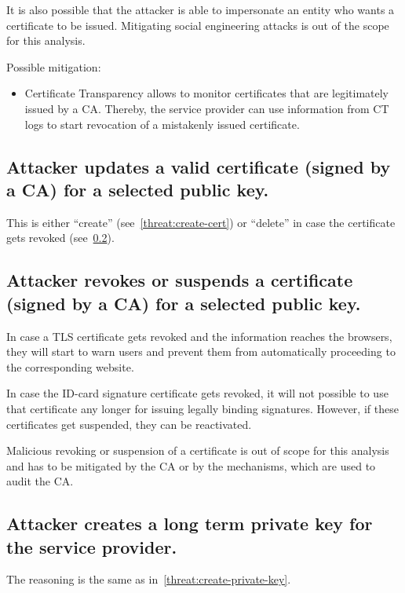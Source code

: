 It is also possible that the attacker is able to impersonate an entity who wants a certificate to be issued. Mitigating social engineering attacks is out of the scope for this analysis. 

Possible mitigation:
\begin{itemize}
 \item Certificate Transparency allows to monitor certificates that are legitimately issued by a CA. Thereby, the service provider can use  information from CT logs to start revocation of a mistakenly issued certificate. 
 \end{itemize} 



\subsection{Attacker updates a valid certificate (signed by a CA) for a selected public key.}
This is either ``create'' (see~\ref{threat:create-cert}) or ``delete'' in case the certificate gets revoked (see~\ref{threat:delete-cert}).


\subsection{Attacker revokes or suspends a certificate (signed by a CA) for a selected public key.}
\label{threat:delete-cert}
In case a TLS certificate gets revoked and the information reaches the browsers, they will start to warn users and prevent them from automatically proceeding to the corresponding website.

In case the ID-card signature certificate gets revoked, it will not possible to use that certificate any longer for issuing legally binding signatures. However, if these certificates get suspended, they can be reactivated.

Malicious revoking or suspension of a certificate is out of scope for this analysis and has to be mitigated by the CA or by the mechanisms, which are used to audit the CA. 



\subsection{Attacker creates a long term private key for the service provider.}
\label{threat:create-privkey-server}
The reasoning is the same as in~\ref{threat:create-private-key}. 



